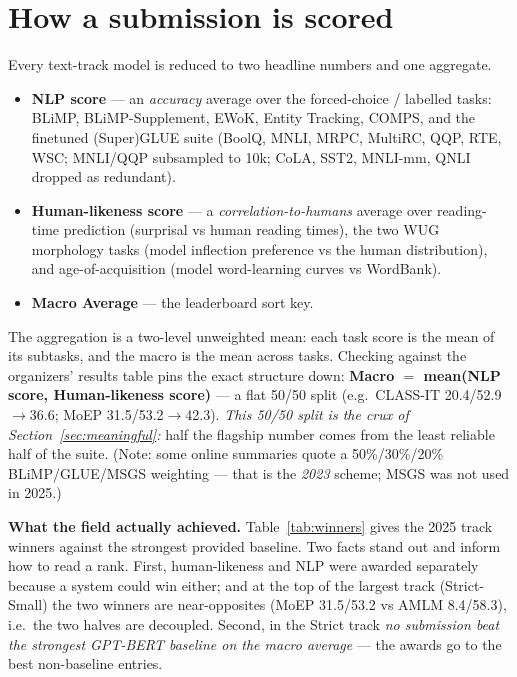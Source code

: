 \documentclass[11pt]{article}
\begin{document}
\section{How a submission is scored}
\label{sec:scoring}
Every text-track model is reduced to two headline numbers and one aggregate.

\begin{itemize}\itemsep2pt
\item \textbf{NLP score} --- an \emph{accuracy} average over the forced-choice / labelled
tasks: BLiMP, BLiMP-Supplement, EWoK, Entity Tracking, COMPS, and the finetuned
(Super)GLUE suite (BoolQ, MNLI, MRPC, MultiRC, QQP, RTE, WSC; MNLI/QQP subsampled to 10k;
CoLA, SST2, MNLI-mm, QNLI dropped as redundant).
\item \textbf{Human-likeness score} --- a \emph{correlation-to-humans} average over
reading-time prediction (surprisal vs human reading times), the two WUG morphology tasks
(model inflection preference vs the human distribution), and age-of-acquisition (model
word-learning curves vs WordBank).
\item \textbf{Macro Average} --- the leaderboard sort key.
\end{itemize}

The aggregation is a two-level unweighted mean: each task score is the mean of its subtasks,
and the macro is the mean across tasks. Checking against the organizers' results table pins
the exact structure down: \textbf{Macro $=$ mean(NLP score, Human-likeness score)} --- a flat
50/50 split (e.g.\ CLASS-IT 20.4/52.9$\to$36.6; MoEP 31.5/53.2$\to$42.3). \emph{This 50/50
split is the crux of Section~\ref{sec:meaningful}:} half the flagship number comes from the
least reliable half of the suite. (Note: some online summaries quote a 50\%/30\%/20\%
BLiMP/GLUE/MSGS weighting --- that is the \emph{2023} scheme; MSGS was not used in 2025.)

\textbf{What the field actually achieved.} Table~\ref{tab:winners} gives the 2025 track
winners against the strongest provided baseline. Two facts stand out and inform how to read a
rank. First, human-likeness and NLP were awarded separately because a system could win either;
and at the top of the largest track (Strict-Small) the two winners are near-opposites (MoEP
31.5/53.2 vs AMLM 8.4/58.3), i.e.\ the two halves are decoupled. Second, in the Strict track
\emph{no submission beat the strongest GPT-BERT baseline on the macro average} --- the awards
go to the best non-baseline entries.
\end{document}
